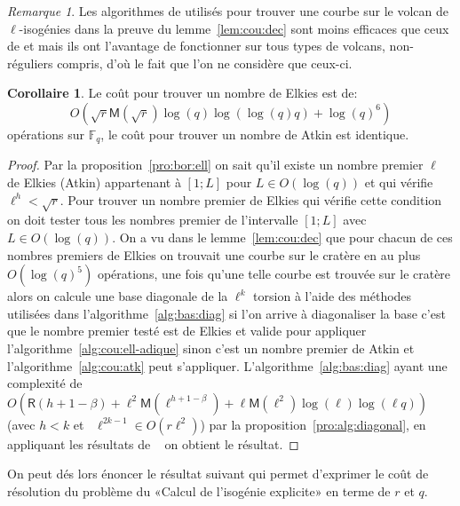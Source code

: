 \documentclass[10pt,a4paper]{book}
\theoremstyle{plain}
\theoremstyle{definition}
\theoremstyle{definition}
\theoremstyle{definition}
\newtheorem{cor}[thm]{Corollaire}
\theoremstyle{definition}
\theoremstyle{definition}
\theoremstyle{remark}
\newtheorem{rem}[thm]{Remarque}
\theoremstyle{remark}
\theoremstyle{definition}
\begin{document}
\begin{rem}
Les algorithmes de \cite{FouquetMorain02} utilisés pour trouver une courbe sur 
le volcan de $\ell$-isogénies  dans la preuve du 
lemme~\ref{lem:cou:dec} sont moins efficaces que ceux de 
\cite{Ionica-Joux10} et \cite{MiretMRV05} mais ils ont l'avantage de 
fonctionner sur tous types de volcans, non-réguliers compris, d'où le fait que
l'on ne considère que ceux-ci.
\end{rem}

\begin{cor}
\label{cor:atk:elk:dist}
Le coût pour trouver un nombre de Elkies est de:
\[O(\sqrt{r}\mathsf{M}(\sqrt{r})\log(q)\log(\log(q) q)+\log(q)^6)\]
opérations sur $\mathbb{F}_q$, le coût pour trouver un nombre de Atkin est 
identique.
\end{cor}

\begin{proof}
Par la proposition~\ref{pro:bor:ell} on sait qu'il existe un nombre premier 
$\ell$ de Elkies (Atkin) appartenant à $[1;L]$ pour $L \in O(\log(q))$ et qui 
vérifie $\ell^{h} < \sqrt{r}$. Pour trouver un nombre premier de Elkies qui 
vérifie cette condition on doit tester tous les nombres premier de l'intervalle
$[1;L]$ avec $L \in O(\log(q))$. On a vu dans le lemme~\ref{lem:cou:dec} 
que pour chacun de ces nombres premiers de Elkies on trouvait une courbe sur le
cratère en au plus $O(\log(q)^5)$ opérations, une fois qu'une telle courbe est 
trouvée sur le cratère alors on calcule une base diagonale de la $\ell^k$ 
torsion à l'aide des méthodes utilisées dans l'algorithme~\ref{alg:bas:diag} si
l'on arrive à diagonaliser la base c'est que le nombre premier testé est de 
Elkies et valide pour appliquer l'algorithme~\ref{alg:cou:ell-adique} sinon 
c'est un nombre premier de Atkin et l'algorithme~\ref{alg:cou:atk} peut 
s'appliquer. L'algorithme~\ref{alg:bas:diag} ayant une complexité de 
$O(\mathsf{R}(h+1-\beta)+\ell^2\mathsf{M}(\ell^{h+1-\beta})+\ell 
\mathsf{M}(\ell^2)\log(\ell)\log(\ell q))$ (avec $h<k$ et ~$\ell^{2k-1} \in O(r\ell^2)$)
par la proposition~\ref{pro:alg:diagonal}, en appliquant les résultats de 
~\cite[Chapter~14.5]{vzGJG03} on obtient le résultat.
\end{proof}

On peut dés lors énoncer le résultat suivant qui permet d'exprimer le coût de 
résolution du problème du «Calcul de l'isogénie explicite» en terme de $r$ et $q$.
\end{document}

